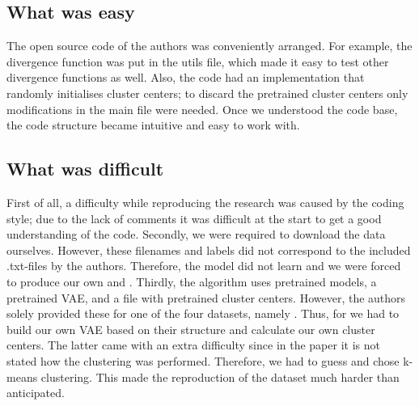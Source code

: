 \subsection{What was easy}


The open source code of the authors was conveniently arranged. For example, the divergence function was put in the utils file, which made it easy to test other divergence functions as well. Also, the code had an implementation that randomly initialises cluster centers; to discard the pretrained cluster centers only modifications in the main file were needed. Once we understood the code base, the code structure became intuitive and easy to work with. 

\subsection{What was difficult}



First of all, a difficulty while reproducing the research was caused by the coding style; due to the lack of comments it was difficult at the start to get a good understanding of the code. Secondly, we were required to download the data ourselves. However, these filenames and labels did not correspond to the included .txt-files by the authors. Therefore, the model did not learn and we were forced to produce our own  and . Thirdly, the algorithm uses pretrained models, a pretrained VAE, and a file with pretrained cluster centers. However, the authors solely provided these for one of the four datasets, namely \USPSMNIST. Thus, for \revMNIST we had to build our own VAE based on their structure and calculate our own cluster centers. The latter came with an extra difficulty since in the paper it is not stated how the clustering was performed. Therefore, we had to guess and chose k-means clustering. This made the reproduction of the \revMNIST dataset much harder than anticipated.

